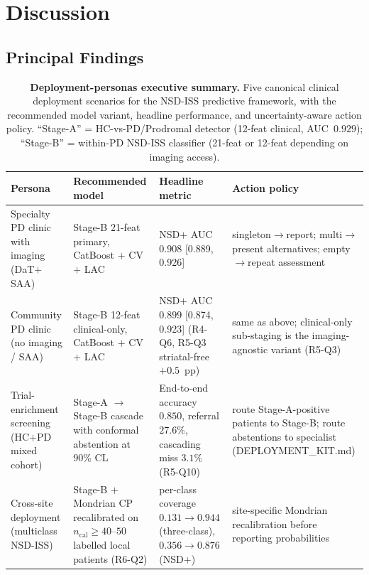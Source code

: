 \section{Discussion}
\label{p1:sec:discussion}

\subsection{Principal Findings}

\begin{table}[!t]
\caption{\textbf{Deployment-personas executive summary.} Five canonical clinical deployment scenarios for the NSD-ISS predictive framework, with the recommended model variant, headline performance, and uncertainty-aware action policy. ``Stage-A'' = HC-vs-PD/Prodromal detector (12-feat clinical, AUC~$0.929$); ``Stage-B'' = within-PD NSD-ISS classifier (21-feat or 12-feat depending on imaging access).}
\label{p1:tab:deployment-personas}
\centering
\footnotesize
\setlength{\tabcolsep}{3pt}
\begin{tabular}{@{}p{2.4cm}p{2.6cm}p{2.0cm}p{2.0cm}@{}}
\toprule
\textbf{Persona} & \textbf{Recommended model} & \textbf{Headline metric} & \textbf{Action policy} \\
\midrule
Specialty PD clinic with imaging (DaT$+$SAA) & Stage-B 21-feat primary, CatBoost $+$ CV$+$ LAC & NSD$+$ AUC $0.908$ [0.889, 0.926] & singleton$\to$report; multi$\to$present alternatives; empty$\to$repeat assessment \\
\midrule
Community PD clinic (no imaging / SAA) & Stage-B 12-feat clinical-only, CatBoost $+$ CV$+$ LAC & NSD$+$ AUC $0.899$ [0.874, 0.923] (R4-Q6, R5-Q3 striatal-free $+0.5$~pp) & same as above; clinical-only sub-staging is the imaging-agnostic variant (R5-Q3) \\
\midrule
Trial-enrichment screening (HC$+$PD mixed cohort) & Stage-A $\to$ Stage-B cascade with conformal abstention at 90\% CL & End-to-end accuracy $0.850$, referral $27.6\%$, cascading miss $3.1\%$ (R5-Q10) & route Stage-A-positive patients to Stage-B; route abstentions to specialist (DEPLOYMENT\_KIT.md) \\
\midrule
Cross-site deployment (multiclass NSD-ISS) & Stage-B $+$ Mondrian CP recalibrated on $n_{\mathrm{cal}}{\geq}40$--$50$ labelled local patients (R6-Q2) & per-class coverage $0.131 \to 0.944$ (three-class), $0.356 \to 0.876$ (NSD$+$) & site-specific Mondrian recalibration before reporting probabilities \\

\end{tabular}
\end{table}
